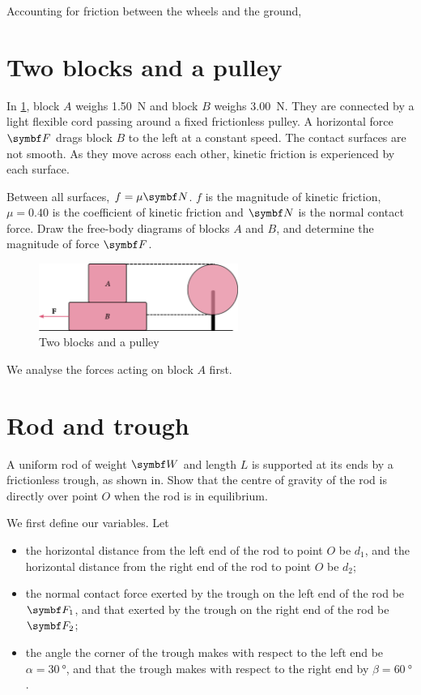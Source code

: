 Accounting for friction between the wheels and the ground,

\section{Two blocks and a pulley}
\begin{problem}
  In \cref{fig:twoblocks}, block \(A\) weighs \qty{1.50}{\newton} and
  block \(B\) weighs
  \qty{3.00}{\newton}. They are connected by a light flexible cord
  passing around a
  fixed frictionless pulley. A horizontal force \(\mv{F}\) drags block
  \(B\) to the left at a constant speed. The contact surfaces are not smooth. As
  they move across each other, kinetic friction is experienced by each surface.

  Between all surfaces, \(f = \mu\mv{N}\). \(f\) is the magnitude
  of kinetic friction, \(\mu=\num{0.40}\) is the coefficient of kinetic friction
  and \(\mv{N}\) is the normal contact force. Draw the free-body
  diagrams of blocks \(A\)
  and \(B\), and determine the magnitude of force \(\mv{F}\).
\end{problem}
\begin{figure}
  \centering
  \includegraphics[width=0.58\textwidth]{assets/twoblocks.png}
  \caption{Two blocks and a pulley}
  \label{fig:twoblocks}
\end{figure}
We analyse the forces acting on block \(A\) first.

\section{Rod and trough}
\begin{problem}
  A uniform rod of weight \(\mv{W}\) and length \(L\) is supported at its ends
  by a frictionless trough, as shown in.
  Show that the centre of gravity of the rod is directly over point \(O\) when
  the rod is in equilibrium.
\end{problem}

We first define our variables. Let
\begin{itemize}
  \item the horizontal distance from the left end of the rod to point
    \(O\) be \(d_1\), and the horizontal distance from the right end
    of the rod to point \(O\) be \(d_2\);
  \item the normal contact force exerted by the trough on the left
    end of the rod be \(\mv{F}_1\), and
    that exerted by the trough on the right end of the rod be \(\mv{F}_2\);
  \item the angle the corner of the trough makes with respect to the
    left end be \(\alpha=\qty{30}{\degree}\),
    and that the trough makes with respect to the right end by
    \(\beta=\qty{60}{\degree}\).
\end{itemize}

